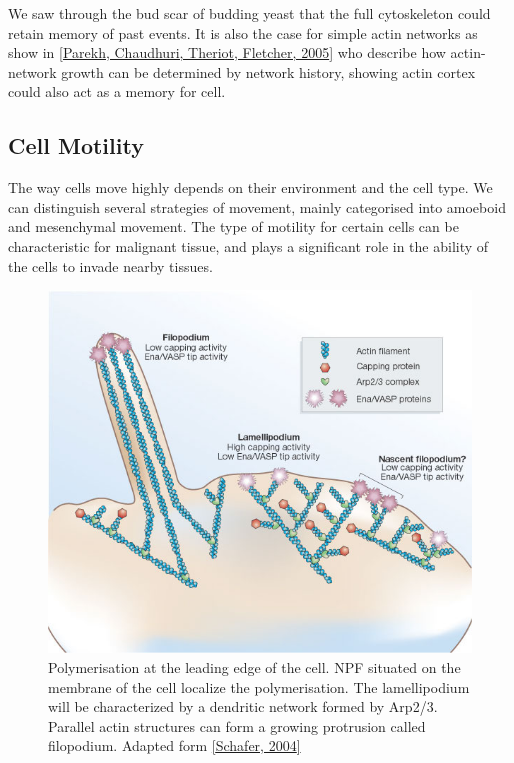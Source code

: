 \documentclass[A4paperpaper,11pt,english]{sphinxmanual}
\begin{document}
We saw through the bud scar of budding yeast that the full cytoskeleton could
retain memory of past events. It is also the case for simple actin networks as
show in {\hyperref[index-latex:parekh2005]{{[}Parekh, Chaudhuri, Theriot, Fletcher,  2005{]}}} who describe how actin-network growth can be
determined by network history, showing actin cortex could also act as a memory
for cell.


\subsection{Cell Motility}
\label{index-latex:cell-motility}
The way cells move highly depends on their environment and the cell type.
We can distinguish several strategies of movement, mainly categorised into
amoeboid and mesenchymal movement. The type of motility for certain
cells can be characteristic for malignant tissue, and plays a significant role in
the ability of the cells to invade nearby tissues.
\begin{figure}[htbp]
\centering
\capstart

\includegraphics[width=0.600\linewidth]{Schafer2004.jpg}
\caption{Polymerisation at the leading edge of the cell. NPF situated on the
membrane of the cell localize the polymerisation. The lamellipodium will be
characterized by a dendritic network formed by Arp2/3. Parallel actin
structures can form a growing protrusion called filopodium.  Adapted form
{\hyperref[index-latex:schafer2004]{{[}Schafer,  2004{]}}}}\label{index-latex:fig-schafer}\end{figure}
\end{document}
